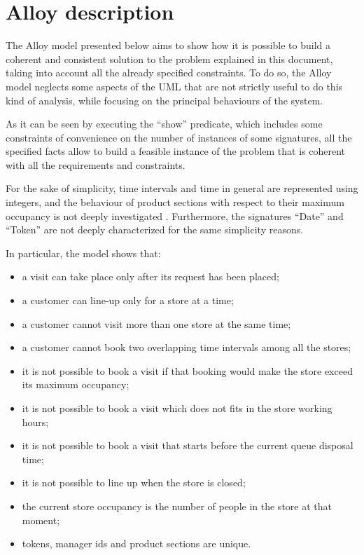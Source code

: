 \documentclass[a4paper,oneside,11pt]{book}   %
\begin{document}
    \section{Alloy description}
    The Alloy model presented below aims to show how it is possible to build a coherent and consistent solution to the problem explained in this document, taking into account all the already specified constraints. To do so, the Alloy model neglects some aspects of the UML that are not strictly useful to do this kind of analysis, while focusing on the principal behaviours of the system. \par
    As it can be seen by executing the “show” predicate, which includes some constraints of convenience on the number of instances of some signatures, all the specified facts allow to build a feasible instance of the problem that is coherent with all the requirements and constraints. \par
    For the sake of simplicity, time intervals and time in general are represented using integers, and the behaviour of product sections with respect to their maximum occupancy is not deeply investigated . Furthermore, the signatures “Date” and “Token” are not deeply characterized for the same simplicity reasons. \par
    In particular, the model shows that:
    \begin{itemize}
        \item a visit can take place only after its request has been placed;
        \item a customer can line-up only for a store at a time;
        \item a customer cannot visit more than one store at the same time;
        \item a customer cannot book two overlapping time intervals among all the stores;
        \item it is not possible to book a visit if that booking would make the store exceed its maximum occupancy;
        \item it is not possible to book a visit which does not fits in the store working hours;
        \item it is not possible to book a visit that starts before the current queue disposal time;
        \item it is not possible to line up when the store is closed;
        \item the current store occupancy is the number of people in the store at that moment;
        \item tokens, manager ids and product sections are unique.
    \end{itemize}
\end{document}
